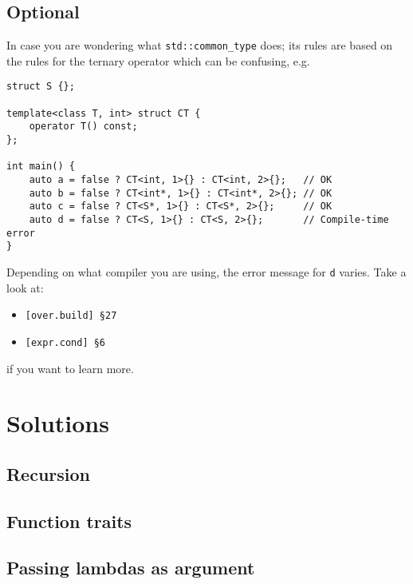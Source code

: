\documentclass{scrartcl}
\newcommand{\inputcpplisting}[1]{}
\begin{document}
\subsection{Optional}
In case you are wondering what \texttt{std::common\_type} does; its rules are based on the rules for the ternary operator which can be confusing, e.g.
\begin{lstlisting}[title=\href{https://godbolt.org/z/4TGmK6}{\texttt{godbolt.org/z/4TGmK6}}]
struct S {};

template<class T, int> struct CT {
    operator T() const;
};

int main() {
    auto a = false ? CT<int, 1>{} : CT<int, 2>{};   // OK
    auto b = false ? CT<int*, 1>{} : CT<int*, 2>{}; // OK
    auto c = false ? CT<S*, 1>{} : CT<S*, 2>{};     // OK
    auto d = false ? CT<S, 1>{} : CT<S, 2>{};       // Compile-time error
}
\end{lstlisting}
Depending on what compiler you are using, the error message for \texttt{d} varies. Take a look at:
\begin{itemize}
    \item \texttt{[over.build] \S27}
    \item \texttt{[expr.cond] \S6}
\end{itemize}
if you want to learn more.

\newpage

\section{Solutions}

\subsection{Recursion}
\inputcpplisting{snippet35}

\newpage

\subsection{Function traits}
\inputcpplisting{snippet21}

\newpage

\subsection{Passing lambdas as argument}
\inputcpplisting{snippet20}
\end{document}
